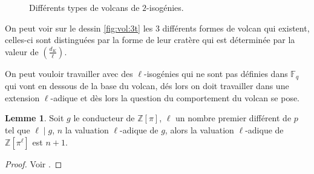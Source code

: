 \documentclass[10pt,a4paper]{book}
\theoremstyle{plain}
\theoremstyle{definition}
\newtheorem{lem}[thm]{Lemme}
\theoremstyle{definition}
\theoremstyle{definition}
\theoremstyle{definition}
\theoremstyle{remark}
\theoremstyle{remark}
\theoremstyle{definition}
\begin{document}
\begin{figure}[h]
\begin{center}
		\end{center}
		\caption{Différents types de volcans de $2$-isogénies.}
\end{figure}
On peut voir sur le dessin \ref{fig:vol:3t} les 3 différents formes de volcan qui existent, celles-ci sont distinguées par la forme de leur cratère qui est déterminée par la valeur de $\left( \frac{d_K}{\ell} \right)$.

On peut vouloir travailler avec des $\ell$-isogénies qui ne sont pas définies dans $\mathbb{F}_q$ qui vont en dessous de la base du volcan, dés lors on doit travailler dans une extension $\ell$-adique et dès lors la question du comportement du volcan se pose.

\begin{lem}
\label{lem:val:ext}
Soit $g$ le conducteur de $\mathbb{Z}[\pi]$, $\ell$ un nombre premier différent de $p$ tel que $\ell \mid g$, $n$ la valuation $\ell$-adique de $g$, alors la valuation $\ell$-adique de $\mathbb{Z}[\pi^{\ell}]$ est $n+1$. 
\end{lem}

\begin{proof}
Voir \cite[Proposition 6]{MiretMSTV08}.
\end{proof}
\end{document}
